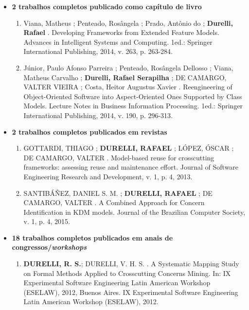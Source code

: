 \documentclass[12pt]{article}
\begin{document}
\begin{itemize}
	
	\item \textbf{2 trabalhos completos publicado como capítulo de livro}
		\begin{enumerate}
			
			\item Viana, Matheus ; Penteado, Rosângela ; Prado, Antônio do ; \textbf{Durelli, Rafael} . Developing Frameworks from Extended Feature Models. Advances in Intelligent Systems and Computing. 1ed.: Springer International Publishing, 2014, v. 263, p. 263-284.
			\item Júnior, Paulo Afonso Parreira ; Penteado, Rosângela Dellosso ; Viana, Matheus Carvalho ; \textbf{Durelli, Rafael Serapilha} ; DE CAMARGO, VALTER VIEIRA ; Costa, Heitor Augustus Xavier . Reengineering of Object-Oriented Software into Aspect-Oriented Ones Supported by Class Models. Lecture Notes in Business Information Processing. 1ed.: Springer International Publishing, 2014, v. 190, p. 296-313.
			
		\end{enumerate}
	
	\item \textbf{2 trabalhos completos publicados em revistas}
		\begin{enumerate}
			\item GOTTARDI, THIAGO ; \textbf{DURELLI, RAFAEL} ; LÓPEZ, ÓSCAR ; DE CAMARGO, VALTER . Model-based reuse for crosscutting frameworks: assessing reuse and maintenance effort. Journal of Software Engineering Research and Development, v. 1, p. 4, 2013.
			\item SANTIBÁÑEZ, DANIEL S. M. ; \textbf{DURELLI, RAFAEL} ; DE CAMARGO, VALTER . A Combined Approach for Concern Identification in KDM models. Journal of the Brazilian Computer Society, v. 1, p. 4, 2015.
		\end{enumerate}
	\item \textbf{18 trabalhos completos publicados em anais de congressos/\textit{workshops}}
	\begin{enumerate}
	    
	    \item \textbf{DURELLI, R. S.}; DURELLI, V. H. S. . A Systematic Mapping Study on Formal Methods Applied to Crosscutting Concerns Mining. In: IX Experimental Software Engineering Latin American Workshop (ESELAW), 2012, Buenos Aires. IX Experimental Software Engineering Latin American Workshop (ESELAW), 2012.
	 	

\end{enumerate}
\end{itemize}
\end{document}
